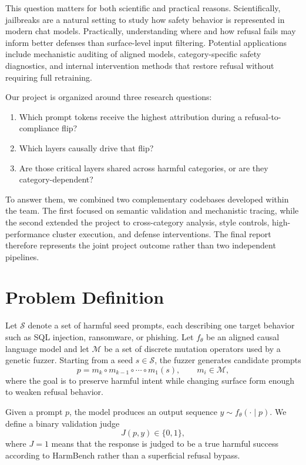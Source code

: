 \documentclass{article}
\begin{document}
This question matters for both scientific and practical reasons. Scientifically, jailbreaks are a natural setting to study how safety behavior is represented in modern chat models. Practically, understanding where and how refusal fails may inform better defenses than surface-level input filtering. Potential applications include mechanistic auditing of aligned models, category-specific safety diagnostics, and internal intervention methods that restore refusal without requiring full retraining.

Our project is organized around three research questions:
\begin{enumerate}[leftmargin=1.2em]
    \item Which prompt tokens receive the highest attribution during a refusal-to-compliance flip?
    \item Which layers causally drive that flip?
    \item Are those critical layers shared across harmful categories, or are they category-dependent?
\end{enumerate}

To answer them, we combined two complementary codebases developed within the team. The first focused on semantic validation and mechanistic tracing, while the second extended the project to cross-category analysis, style controls, high-performance cluster execution, and defense interventions. The final report therefore represents the joint project outcome rather than two independent pipelines.

\section{Problem Definition}
Let $\mathcal{S}$ denote a set of harmful seed prompts, each describing one target behavior such as SQL injection, ransomware, or phishing. Let $f_\theta$ be an aligned causal language model and let $\mathcal{M}$ be a set of discrete mutation operators used by a genetic fuzzer. Starting from a seed $s \in \mathcal{S}$, the fuzzer generates candidate prompts
\[
p = m_k \circ m_{k-1} \circ \cdots \circ m_1(s), \qquad m_i \in \mathcal{M},
\]
where the goal is to preserve harmful intent while changing surface form enough to weaken refusal behavior.

Given a prompt $p$, the model produces an output sequence $y \sim f_\theta(\cdot \mid p)$. We define a binary validation judge
\[
J(p,y) \in \{0,1\},
\]
where $J=1$ means that the response is judged to be a true harmful success according to HarmBench rather than a superficial refusal bypass.
\end{document}
